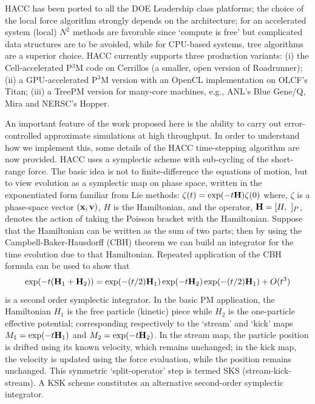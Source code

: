 HACC has been ported to all the DOE Leadership class platforms; the
choice of the local force algorithm strongly depends on the
architecture; for an accelerated system (local) $N^2$ methods are
favorable since `compute is free' but complicated data structures are
to be avoided, while for CPU-based systems, tree algorithms are a
superior choice. HACC currently supports three production variants:
(i) the Cell-accelerated P$^3$M code on Cerrillos (a smaller, open
version of Roadrunner); (ii) a GPU-accelerated P$^3$M version with an
OpenCL implementation on OLCF's Titan; (iii) a TreePM version for
many-core machines, e.g., ANL's Blue Gene/Q, Mira and NERSC's Hopper.

An important feature of the work proposed here is the ability to carry
out error-controlled approximate simulations at high throughput. In
order to understand how we implement this, some details of the HACC
time-stepping algorithm are now provided. HACC uses a symplectic
scheme with sub-cycling of the short-range force. The basic idea is
not to finite-difference the equations of motion, but to view
evolution as a symplectic map on phase space, written in the
exponentiated form familiar from Lie methods:
$\zeta(t)=\exp(-t{\bf{H}})\zeta(0)$ where, $\zeta$ is a phase-space
vector $({\bf x}, {\bf v})$, $H$ is the Hamiltonian, and the operator,
${\bf{H}}=[H,~]_P$, denotes the action of taking the Poisson bracket
with the Hamiltonian. Suppose that the Hamiltonian can be written as
the sum of two parts; then by using the Campbell-Baker-Hausdorff (CBH)
theorem we can build an integrator for the time evolution due to that
Hamiltonian. Repeated application of the CBH formula can be used to
show that \begin{displaymath}
  \exp(-t({\bf{H}}_1+{\bf{H}}_2))=\exp(-(t/2){\bf{H}}_1)\exp(-t{\bf{H}}_2)
  \exp(-(t/2){\bf{H}}_1) + O(t^3)\end{displaymath} is a second order
symplectic integrator. In the basic PM application, the Hamiltonian
$H_1$ is the free particle (kinetic) piece while $H_2$ is the
one-particle effective potential; corresponding respectively to the
`stream' and `kick' maps $M_1=\exp(-t{\bf{H}}_1)$ and
$M_2=\exp(-t{\bf{H}}_2)$. In the stream map, the particle position is
drifted using its known velocity, which remains unchanged; in the kick
map, the velocity is updated using the force evaluation, while the
position remains unchanged. This symmetric `split-operator' step is
termed SKS (stream-kick-stream). A KSK scheme constitutes an
alternative second-order symplectic integrator.

